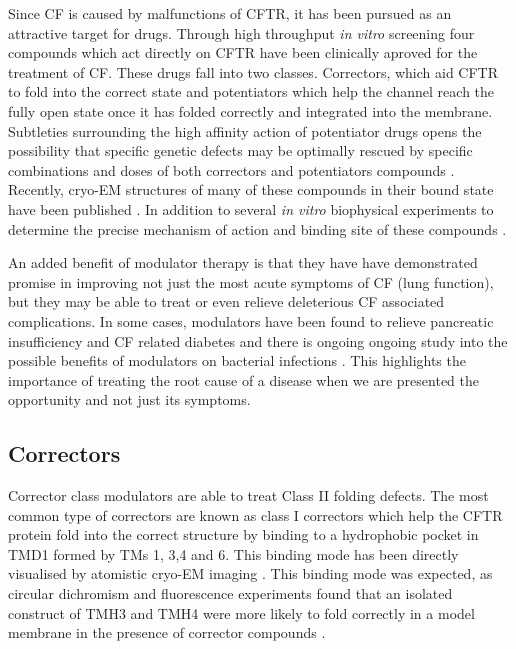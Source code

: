Since CF is caused by malfunctions of CFTR, it has been pursued as an attractive target for drugs. Through high throughput \textit{in vitro} screening four compounds which act directly on CFTR have been clinically aproved for the treatment of CF. These drugs fall into two classes. Correctors, which aid CFTR to fold into the correct state and potentiators which help the channel reach the fully open state once it has folded correctly and integrated into the membrane. Subtleties surrounding the high affinity action of potentiator drugs opens the possibility that specific genetic defects may be optimally rescued by specific combinations and doses of both correctors and potentiators compounds \cite{csanady2019}. Recently, cryo-EM structures of many of these compounds in their bound state have been published \cite{liu2019, fiedorczuk2022}. In addition to several \textit {in vitro} biophysical experiments to determine the precise mechanism of action and binding site of these compounds \cite{csanady2019,  laselva2022, yeh2017, yeh2019, fiedorczuk2022, krainer2018}.

An added benefit of modulator therapy is that they have have demonstrated promise in improving not just the most acute symptoms of CF (lung function), but they may be able to treat or even relieve deleterious CF associated complications. In some cases, modulators have been found to relieve pancreatic insufficiency and CF related diabetes \cite{gaines2021,lopes-pacheco2020, yi2021} and there is ongoing ongoing study into the possible benefits of modulators on bacterial infections \cite{harvey2022}. This highlights the importance of treating the root cause of a disease when we are presented the opportunity and not just its symptoms. 

\subsection{Correctors}
Corrector class modulators are able to treat Class II folding defects. The most common type of correctors are known as class I correctors which help the CFTR protein fold into the correct structure by binding to a hydrophobic pocket in TMD1 formed by TMs 1, 3,4 and 6. This binding mode has been directly visualised by atomistic cryo-EM imaging \cite{fiedorczuk2022}. This binding mode was expected, as circular dichromism \cite{greenfield2006} and fluorescence experiments found that an isolated construct of TMH3 and TMH4 were more likely to fold correctly in a model membrane in the presence of corrector compounds \cite{krainer2018}. 


